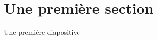 
\begin{comment}

\PassOptionsToPackage{french}{translator}

\documentclass[10pt]{beamer}

\usepackage{AOCDTF-cnam_diaporama}






\end{comment}

\section{Une première section}

\begin{frame}{Une première diapositive}
\lipsum[1]
\end{frame}

%
